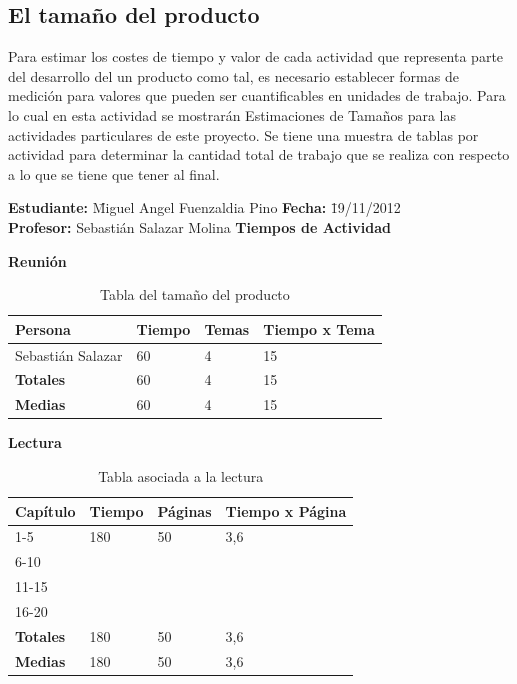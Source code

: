\documentclass[a4paper,12pt,openany,oneside]{book}
\begin{document}
\subsection{El tamaño del producto}
Para estimar los costes de tiempo y valor de cada actividad que representa parte del desarrollo del un producto como tal, es necesario establecer formas de medición para valores que pueden ser cuantificables en unidades de trabajo. Para lo cual en esta actividad se mostrarán Estimaciones de Tamaños para las actividades particulares de este proyecto. Se tiene una muestra de tablas por actividad para determinar la cantidad total de trabajo que se realiza con respecto a lo que se tiene que tener al final.
\newpage
\begin{table}
\begin{tabbing}
\textbf{Estudiante:} \= Miguel Angel Fuenzaldia Pino \= \textbf{Fecha:} \= 19/11/2012\\
\textbf{Profesor:} \> Sebastián Salazar Molina \> \textbf{Tiempos de Actividad} \>  \\
\end{tabbing}
\textbf{Reunión}\\
\begin{tabular}{| l | l | l | l |}
\hline
\textbf{Persona} & \textbf{Tiempo} & \textbf{Temas} & \textbf{Tiempo x Tema}\\
\hline
Sebastián Salazar & 60 & 4 & 15\\
\hline
\textbf{Totales} & 60 & 4 & 15 \\
\hline
\textbf{Medias} & 60 & 4 & 15 \\
\hline
\end{tabular}
\caption{Tabla del tamaño del producto}
\end{table}
\begin{table}
\textbf{Lectura}\\
\begin{tabular}{| l | l | l | l |}
\hline
\textbf{Capítulo} & \textbf{Tiempo} & \textbf{Páginas} & \textbf{Tiempo x Página}\\
\hline
1-5   & 180 & 50 & 3,6 \\
\hline
6-10  & & & \\
\hline
11-15 & & & \\
\hline
16-20 & & & \\
\hline
\textbf{Totales} & 180 & 50 & 3,6 \\
\hline
\textbf{Medias} & 180 & 50 & 3,6 \\
\hline
\end{tabular}
\caption{Tabla asociada a la lectura}
\end{table}
\end{document}

